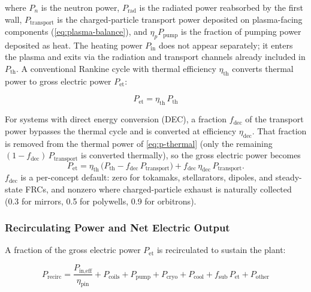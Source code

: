 \documentclass{article}
\begin{document}
\noindent where $P_n$ is the neutron power, $P_{\text{rad}}$ is the
radiated power reabsorbed by the first wall, $P_{\text{transport}}$ is the
charged-particle transport power deposited on plasma-facing components
(\cref{eq:plasma-balance}), and $\eta_p P_{\text{pump}}$ is the fraction
of pumping power deposited as heat. The heating power $P_{\text{in}}$ does not appear
separately; it enters the plasma and exits via the radiation and
transport channels already included in $P_{\text{th}}$.
A conventional Rankine cycle with thermal efficiency $\eta_{\text{th}}$
converts thermal power to gross electric power $P_{\text{et}}$:

\begin{equation}
\label{eq:p-gross}
P_{\text{et}} = \eta_{\text{th}} \, P_{\text{th}}
\end{equation}

\noindent For systems with direct energy conversion (DEC), a fraction
$f_{\text{dec}}$ of the transport power bypasses the thermal cycle and is
converted at efficiency $\eta_{\text{dec}}$. That fraction is removed from
the thermal power of \cref{eq:p-thermal} (only the remaining
$(1-f_{\text{dec}})\,P_{\text{transport}}$ is converted thermally), so the
gross electric power becomes
\begin{equation}
\label{eq:p-gross-dec}
P_{\text{et}} = \eta_{\text{th}}\,\bigl(P_{\text{th}}
  - f_{\text{dec}}\,P_{\text{transport}}\bigr)
  + f_{\text{dec}}\,\eta_{\text{dec}}\,P_{\text{transport}}.
\end{equation}
$f_{\text{dec}}$ is a per-concept default: zero for tokamaks, stellarators,
dipoles, and steady-state FRCs, and nonzero where charged-particle exhaust
is naturally collected (0.3 for mirrors, 0.5 for polywells, 0.9 for
orbitrons).

\subsubsection{Recirculating Power and Net Electric Output}

A fraction of the gross electric power $P_{\text{et}}$ is recirculated
to sustain the plant:

\begin{equation}
\label{eq:p-recirc}
P_{\text{recirc}} = \frac{P_{\text{in,eff}}}{\eta_{\text{pin}}}
  + P_{\text{coils}} + P_{\text{pump}} + P_{\text{cryo}}
  + P_{\text{cool}} + f_{\text{sub}} \, P_{\text{et}}
  + P_{\text{other}}
\end{equation}
\end{document}
